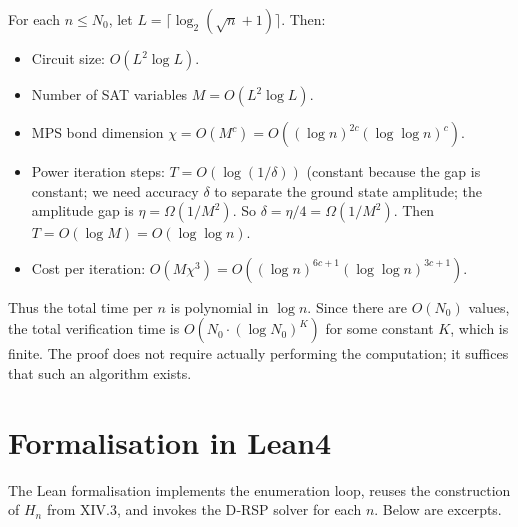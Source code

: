 \documentclass[11pt,a4paper]{article}
\begin{document}
For each \(n \le N_0\), let \(L = \lceil \log_2(\sqrt{n}+1)\rceil\). Then:
\begin{itemize}
\item Circuit size: \(O(L^2 \log L)\).
\item Number of SAT variables \(M = O(L^2 \log L)\).
\item MPS bond dimension \(\chi = O(M^c) = O((\log n)^{2c} (\log \log n)^c)\).
\item Power iteration steps: \(T = O(\log(1/\delta))\) (constant because the gap is constant; we need accuracy \(\delta\) to separate the ground state amplitude; the amplitude gap is \(\eta = \Omega(1/M^2)\). So \(\delta = \eta/4 = \Omega(1/M^2)\). Then \(T = O(\log M) = O(\log \log n)\).
\item Cost per iteration: \(O(M\chi^3) = O((\log n)^{6c+1} (\log \log n)^{3c+1})\).
\end{itemize}
Thus the total time per \(n\) is polynomial in \(\log n\). Since there are \(O(N_0)\) values, the total verification time is \(O(N_0 \cdot (\log N_0)^K)\) for some constant \(K\), which is finite. The proof does not require actually performing the computation; it suffices that such an algorithm exists.

\section{Formalisation in Lean4}

The Lean formalisation implements the enumeration loop, reuses the construction of \(H_n\) from XIV.3, and invokes the D‑RSP solver for each \(n\). Below are excerpts.
\end{document}
